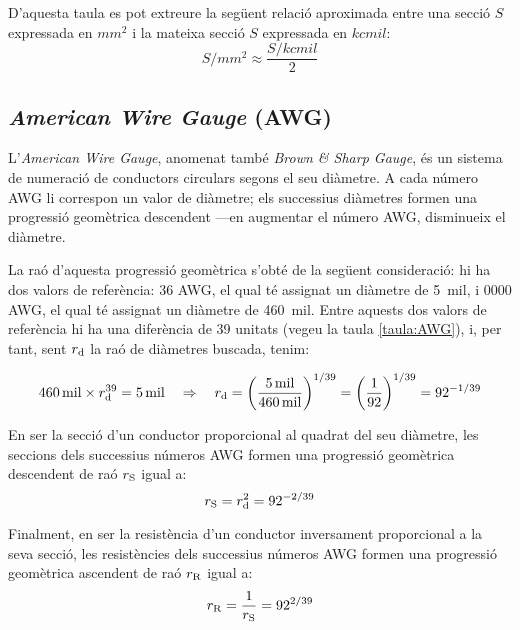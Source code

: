 D'aquesta taula es pot extreure la següent relació aproximada entre una secció $S$ expressada en $\unit{mm^2}$ i la mateixa secció $S$ expressada en $\unit{kcmil}$:
\begin{equation}
  S/{\scriptstyle\unit{mm^2}} \approx \frac{ S/{\scriptstyle\unit{kcmil}}}{2}
\end{equation}



\subsection{\textit{American Wire Gauge} (AWG)}\label{sec:awg}

L'\textit{American Wire Gauge}, anomenat també \textit{Brown \& Sharp Gauge}, és un sistema de numeració de conductors circulars segons el seu diàmetre. A cada número AWG li correspon un valor de diàmetre; els successius diàmetres formen una progressió geomètrica descendent ---en augmentar el número AWG, disminueix el diàmetre.

La raó d'aquesta progressió geomètrica s'obté de la següent consideració: hi ha dos valors de referència: 36 AWG, el qual té assignat un diàmetre de \qty{5}{mil}, i 0000 AWG, el qual té assignat un diàmetre de \qty{460}{mil}. Entre aquests dos valors de referència hi ha una diferència de 39 unitats (vegeu la taula \vref{taula:AWG}), i, per tant, sent $r_\mathrm{d}$ la raó de diàmetres buscada, tenim:

\begin{equation}
   \qty{460}{mil} \times r_\mathrm{d}^{39} = \qty{5}{mil} \quad \Rightarrow \quad r_\mathrm{d} = \left( \frac{\qty{5}{mil}}{\qty{460}{mil}} \right)^{1/39} = \left( \frac{1}{92} \right)^{1/39} = 92^{-1/39}
\end{equation}

En ser la secció d'un conductor proporcional al quadrat del seu diàmetre, les seccions dels successius números AWG formen una progressió geomètrica  descendent de raó $r_\mathrm{S}$ igual a: \begin{equation}
   r_\mathrm{S} = r_\mathrm{d}^2 = 92^{-2/39}
\end{equation}

Finalment, en ser la resistència d'un conductor inversament proporcional a la seva secció, les resistències dels successius números AWG formen una progressió geomètrica ascendent de raó $r_\mathrm{R}$ igual a:
\begin{equation}
   r_\mathrm{R} = \frac{1}{r_\mathrm{S}} = 92^{2/39}
\end{equation}

